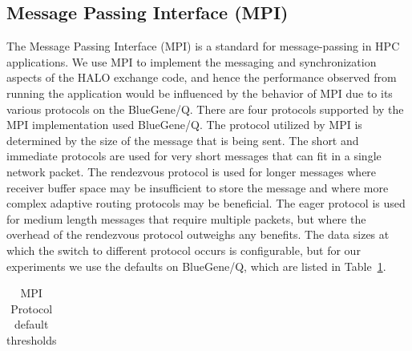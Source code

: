 \documentclass{acm_proc_article-sp}
\begin{document}
\subsection{Message Passing Interface (MPI)}
The Message Passing Interface (MPI) is a standard for message-passing in HPC applications.
We use MPI to implement the messaging and synchronization aspects of the HALO exchange code,
and hence the performance observed from running the application would be influenced by the behavior of MPI due to its various protocols on the BlueGene/Q.
There are four protocols supported by the MPI implementation used BlueGene/Q.
The protocol utilized by MPI is determined by the size of the message that is being sent.  The short and immediate protocols are used for very short
messages that can fit in a single network packet.  The rendezvous
protocol is used for longer messages where receiver buffer space may
be insufficient to store the message and where more complex adaptive
routing protocols may be beneficial.  The eager protocol
is used for medium length messages that require multiple packets,
but where the overhead of the rendezvous protocol outweighs any
benefits.
The data sizes at which the switch to different protocol occurs is configurable, but for our experiments we use the defaults on BlueGene/Q, which are 
listed in Table~\ref{table:bgq_protocols}.


\begin{table}
  \caption{MPI Protocol default thresholds
    \label{table:bgq_protocols}}
  {\footnotesize
    \begin{tabular}{ | l | l | l | p{1.5cm} |}
    \hline 
    
    \end{tabular}
  }
\end{table}
\end{document}
